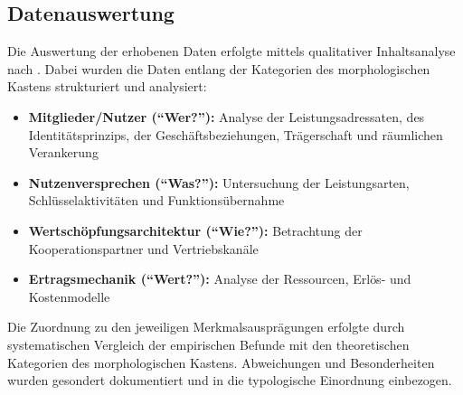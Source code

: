 \subsection{Datenauswertung}

Die Auswertung der erhobenen Daten erfolgte mittels qualitativer Inhaltsanalyse nach \textcite{mayring2010}. Dabei wurden die Daten entlang der Kategorien des morphologischen Kastens strukturiert und analysiert:

\begin{itemize}
\item \textbf{Mitglieder/Nutzer (\enquote{Wer?}):} Analyse der Leistungsadressaten, des Identitätsprinzips, der Geschäftsbeziehungen, Trägerschaft und räumlichen Verankerung
\item \textbf{Nutzenversprechen (\enquote{Was?}):} Untersuchung der Leistungsarten, Schlüsselaktivitäten und Funktionsübernahme
\item \textbf{Wertschöpfungsarchitektur (\enquote{Wie?}):} Betrachtung der Kooperationspartner und Vertriebskanäle
\item \textbf{Ertragsmechanik (\enquote{Wert?}):} Analyse der Ressourcen, Erlös- und Kostenmodelle
\end{itemize}

Die Zuordnung zu den jeweiligen Merkmalsausprägungen erfolgte durch systematischen Vergleich der empirischen Befunde mit den theoretischen Kategorien des morphologischen Kastens. Abweichungen und Besonderheiten wurden gesondert dokumentiert und in die typologische Einordnung einbezogen.
